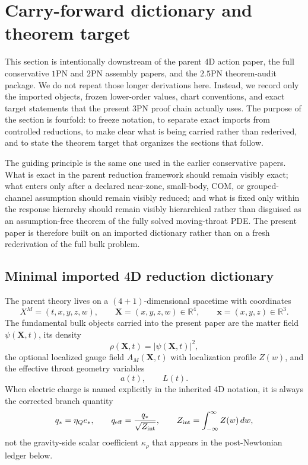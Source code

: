 \documentclass[11pt]{article}
\begin{document}

\section{Carry-forward dictionary and theorem target}
\label{sec:dictionary}

This section is intentionally downstream of the parent $4$D action paper, the
full conservative $1$PN and $2$PN assembly papers, and the $2.5$PN theorem-audit
package.  We do not repeat those longer derivations here.  Instead, we record
only the imported objects, frozen lower-order values, chart conventions, and
exact target statements that the present $3$PN proof chain actually uses.  The
purpose of the section is fourfold: to freeze notation, to separate exact
imports from controlled reductions, to make clear what is being carried rather
than rederived, and to state the theorem target that organizes the sections that
follow.

The guiding principle is the same one used in the earlier conservative papers.
What is exact in the parent reduction framework should remain visibly exact;
what enters only after a declared near-zone, small-body, COM, or grouped-channel
assumption should remain visibly reduced; and what is fixed only within the
response hierarchy should remain visibly hierarchical rather than disguised as an
assumption-free theorem of the fully solved moving-throat PDE.  The present
paper is therefore built on an imported dictionary rather than on a fresh
rederivation of the full bulk problem.

\subsection{Minimal imported \texorpdfstring{$4$}{4}D reduction dictionary}
\label{sec:dict-4d}

The parent theory lives on a $(4+1)$-dimensional spacetime with coordinates
\[
X^M=(t,x,y,z,w),
\qquad
\mathbf{X}=(x,y,z,w)\in\mathbb R^4,
\qquad
\mathbf{x}=(x,y,z)\in\mathbb R^3.
\]
The fundamental bulk objects carried into the present paper are the matter field
$\psi(\mathbf{X},t)$, its density
\[
\rho(\mathbf{X},t)=|\psi(\mathbf{X},t)|^2,
\]
the optional localized gauge field $A_M(\mathbf{X},t)$ with localization profile
$Z(w)$, and the effective throat geometry variables
\[
a(t),\qquad L(t).
\]
When electric charge is named explicitly in the inherited $4$D notation, it is
always the corrected branch quantity
\[
q_* = \eta_Q e_*,
\qquad
q_{\rm eff}=\frac{q_*}{\sqrt{Z_{\rm int}}},
\qquad
Z_{\rm int}=\int_{-\infty}^{\infty} Z(w)\,dw,
\]
not the gravity-side scalar coefficient $\kappa_\rho$ that appears in the
post-Newtonian ledger below.
\end{document}
